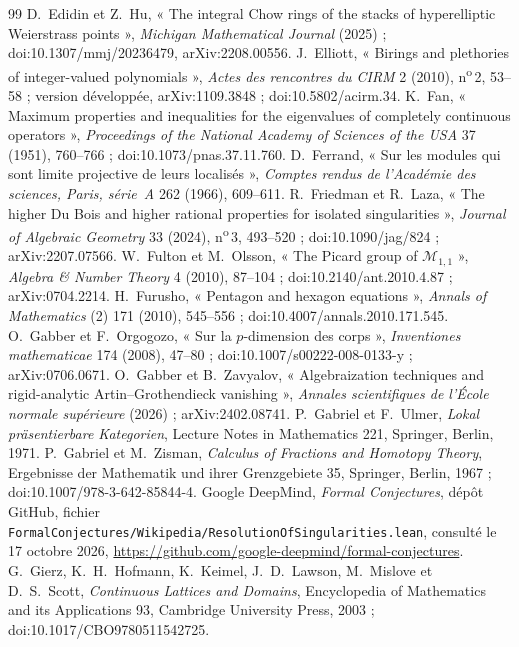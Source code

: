 \documentclass[11pt]{article}
\theoremstyle{plain}
\theoremstyle{definition}
\theoremstyle{plain}
\theoremstyle{definition}
\theoremstyle{remark}
\renewcommand{\_}{\bkunderscore\allowbreak}
\let\origtexttt\texttt
\renewcommand{\texttt}[1]{\origtexttt{\XeTeXinterchartokenstate=1 #1}}
\begin{document}
\begin{thebibliography}{99}
 D.~Edidin et Z.~Hu, « The integral Chow rings of the stacks of hyperelliptic Weierstrass points », \emph{Michigan Mathematical Journal} (2025) ; doi:10.1307/mmj/20236479, arXiv:2208.00556.
 J.~Elliott, « Birings and plethories of integer-valued polynomials », \emph{Actes des rencontres du CIRM} 2 (2010), n\textsuperscript{o}\,2, 53--58 ; version développée, arXiv:1109.3848 ; doi:10.5802/acirm.34.
 K.~Fan, « Maximum properties and inequalities for the eigenvalues of completely continuous operators », \emph{Proceedings of the National Academy of Sciences of the USA} 37 (1951), 760--766 ; doi:10.1073/pnas.37.11.760.
 D.~Ferrand, « Sur les modules qui sont limite projective de leurs localisés », \emph{Comptes rendus de l'Académie des sciences, Paris, série~A} 262 (1966), 609--611.
 R.~Friedman et R.~Laza, « The higher Du Bois and higher rational properties for isolated singularities », \emph{Journal of Algebraic Geometry} 33 (2024), n\textsuperscript{o}\,3, 493--520 ; doi:10.1090/jag/824 ; arXiv:2207.07566.
 W.~Fulton et M.~Olsson, « The Picard group of $\mathcal M_{1,1}$ », \emph{Algebra \& Number Theory} 4 (2010), 87--104 ; doi:10.2140/ant.2010.4.87 ; arXiv:0704.2214.
 H.~Furusho, « Pentagon and hexagon equations », \emph{Annals of Mathematics} (2) 171 (2010), 545--556 ; doi:10.4007/annals.2010.171.545.
 O.~Gabber et F.~Orgogozo, « Sur la $p$-dimension des corps », \emph{Inventiones mathematicae} 174 (2008), 47--80 ; doi:10.1007/s00222-008-0133-y ; arXiv:0706.0671.
 O.~Gabber et B.~Zavyalov, « Algebraization techniques and rigid-analytic Artin--Grothendieck vanishing », \emph{Annales scientifiques de l'École normale supérieure} (2026) ; arXiv:2402.08741.
 P.~Gabriel et F.~Ulmer, \emph{Lokal präsentierbare Kategorien}, Lecture Notes in Mathematics 221, Springer, Berlin, 1971.
 P.~Gabriel et M.~Zisman, \emph{Calculus of Fractions and Homotopy Theory}, Ergebnisse der Mathematik und ihrer Grenzgebiete 35, Springer, Berlin, 1967 ; doi:10.1007/978-3-642-85844-4.
 Google DeepMind, \emph{Formal Conjectures}, dépôt GitHub, fichier \texttt{FormalConjectures/\allowbreak Wikipedia/\allowbreak ResolutionOfSingularities.lean}, consulté le 17 octobre 2026, \url{https://github.com/google-deepmind/formal-conjectures}.
 G.~Gierz, K.~H.~Hofmann, K.~Keimel, J.~D.~Lawson, M.~Mislove et D.~S.~Scott, \emph{Continuous Lattices and Domains}, Encyclopedia of Mathematics and its Applications 93, Cambridge University Press, 2003 ; doi:10.1017/CBO9780511542725.

\end{thebibliography}
\end{document}
